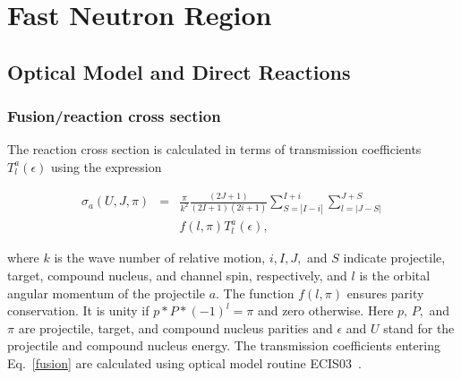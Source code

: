 \documentclass[twocolumn,amsmath,amssymb,10pt,groupedaddress,a4paper]{revtex4}
\begin{document}
\section{Fast Neutron Region}

\subsection{Optical Model and Direct Reactions}
\subsubsection{Fusion/reaction cross section\label{sec: fusion}}
The reaction cross section is calculated in terms of transmission
coefficients $T_{l}^{a}(\epsilon)$ using the expression

\begin{eqnarray}
\sigma_{a}(U,J,\pi)&=&\frac{\pi}{k^{2}}\frac{(2J+1)}{(2I+1)(2i+1)}\sum_{S=|I-i|}^{I+i}\sum_{l=|J-S|}^{J+S}\nonumber\\
                   & &f(l,\pi)T_{l}^{a}(\epsilon),
\label{fusion}
\end{eqnarray}

\noindent where $k$ is the wave number of relative motion, $i,I,J,$
and $S$ indicate projectile, target, compound nucleus, and channel
spin, respectively, and $l$ is the orbital angular momentum of the
projectile $a$. The function $f(l,\pi)$ ensures parity conservation.
It is unity if $p*P*(-1)^{l}=\pi$ and zero otherwise. Here $p,\, P,$
and $\pi$ are projectile, target, and compound nucleus parities and
$\epsilon$ and $U$ stand for the projectile and compound nucleus
energy. The transmission coefficients
entering Eq.~\ref{fusion} are calculated using optical model routine
ECIS03~\cite{ECIS}.

\end{document}
